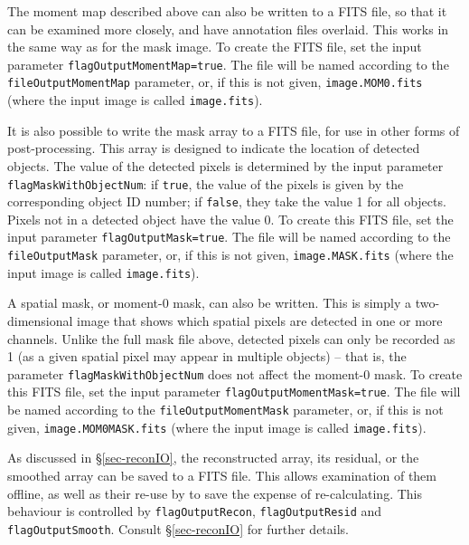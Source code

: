 
\label{sec-momentOut}

The moment map described above can also be written to a FITS file, so
that it can be examined more closely, and have annotation files
overlaid. This works in the same way as for the mask image. To create
the FITS file, set the input parameter
\texttt{flagOutputMomentMap=true}. The file will be named according to
the \texttt{fileOutputMomentMap} parameter, or, if this is not given,
\texttt{image.MOM0.fits} (where the input image is called
\texttt{image.fits}).

\label{sec-maskOut}

It is also possible to write the mask array to a FITS file, for use in
other forms of post-processing. This array is designed to indicate the
location of detected objects. The value of the detected pixels is
determined by the input parameter \texttt{flagMaskWithObjectNum}: if
\texttt{true}, the value of the pixels is given by the corresponding
object ID number; if \texttt{false}, they take the value 1 for all
objects. Pixels not in a detected object have the value 0. To create
this FITS file, set the input parameter
\texttt{flagOutputMask=true}. The file will be named according to the
\texttt{fileOutputMask} parameter, or, if this is not given,
\texttt{image.MASK.fits} (where the input image is called
\texttt{image.fits}).

A spatial mask, or moment-0 mask, can also be written. This is simply
a two-dimensional image that shows which spatial pixels are detected
in one or more channels. Unlike the full mask file above, detected
pixels can only be recorded as 1 (as a given spatial pixel may appear
in multiple objects) -- that is, the parameter
\texttt{flagMaskWithObjectNum} does not affect the moment-0 mask. To
create this FITS file, set the input parameter
\texttt{flagOutputMomentMask=true}. The file will be named according
to the \texttt{fileOutputMomentMask} parameter, or, if this is not
given, \texttt{image.MOM0MASK.fits} (where the input image is called
\texttt{image.fits}).

\label{sec-reconOut}

As discussed in \S\ref{sec-reconIO}, the reconstructed array, its
residual, or the smoothed array can be saved to a FITS file. This
allows examination of them offline, as well as their re-use by
\duchamp to save the expense of re-calculating. This behaviour is
controlled by \texttt{flagOutputRecon}, \texttt{flagOutputResid} and
\texttt{flagOutputSmooth}. Consult \S\ref{sec-reconIO} for further
details.

